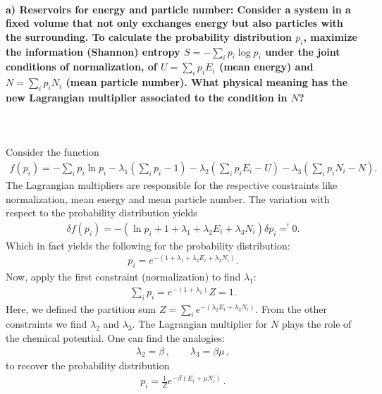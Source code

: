 \paragraph{a) Reservoirs for energy and particle number:
    Consider a system in a fixed volume that not only exchanges energy
    but also particles with the surrounding. To calculate the 
    probability distribution $p_i$, maximize the information 
    (Shannon) entropy $S=-\sum_ip_i\log{p_i}$ under the joint 
    conditions of normalization, of $U=\sum_ip_iE_i$ (mean energy) and 
    $N=\sum_ip_iN_i$ (mean particle number). What physical meaning has 
    the new Lagrangian multiplier associated to the condition in $N$?
} \ \\
\\
    Consider the function 
    \begin{align}
    f(p_i) = - \sum_i p_i \ln p_i - \lambda_1 \left( \sum_i p_i - 1 \right) - \lambda_2 \left( \sum_i p_i E_i - U \right) 
    - \lambda_3 \left( \sum_i p_i N_i - N \right).
    \end{align}
    The Lagrangian multipliers are responsible for the respective constraints like normalization, mean energy and mean particle number.
    The variation with respect to the probability distribution yields
    \begin{align}
    \delta f(p_i) = - \left( \ln p_i + 1 + 
    \lambda_1 + \lambda_2 E_i + \lambda_3 N_i \right) \delta p_i =^{!} 0.
    \end{align}
    Which in fact yields the following for the probability distribution:
    \begin{align}
    p_i = e^{- (1 + \lambda_1 + \lambda_2 E_i + \lambda_3 N_i)}.
    \end{align}
    Now, apply the first constraint (normalization) to find $\lambda_1$:
    \begin{align}
    \sum_i p_i = e^{-(1 + \lambda_1)} Z = 1.
    \end{align}
    Here, we defined the partition sum $Z = \sum_i e^{- (\lambda_2 E_i + \lambda_3 N_i)}$.
    From the other constraints we find $\lambda_2$ and $\lambda_3$. The Lagrangian multiplier for $N$ plays
    the role of the chemical potential. One can find the analogies:
    \begin{align}
    \lambda_2 = \beta \,, \qquad \lambda_3 = \beta \mu \,,
    \end{align}
    to recover the probability distribution
    \begin{align}
    p_i = \frac{1}{Z} e^{-\beta(E_i + \mu N_i)} \,.
    \end{align}


